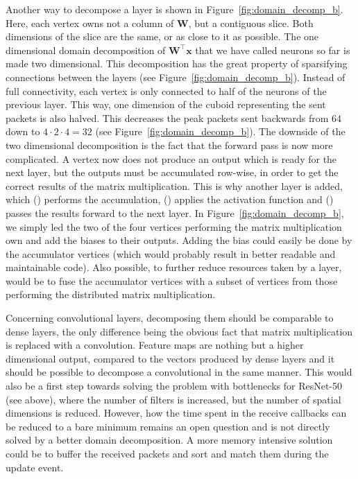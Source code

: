 \documentclass[]{article}
\begin{document}
Another way to decompose a layer is shown in
Figure~\ref{fig:domain_decomp_b}.
Here, each vertex owns not a column of $\mathbf{W}$, but a contiguous
slice.
Both dimensions of the slice are the same, or as close to it as
possible.
The one dimensional domain decomposition of
$\mathbf{W}^\top\mathbf{x}$ that we have called neurons so far is
made two dimensional.
This decomposition has the great property of sparsifying connections
between the layers (see Figure~\ref{fig:domain_decomp_b}).
Instead of full connectivity, each vertex is only connected to half
of the neurons of the previous layer.
This way, one dimension of the cuboid representing the sent packets
is also halved.
This decreases the peak packets sent backwards from $64$ down to
$4 \cdot 2 \cdot 4 = 32$ (see Figure~\ref{fig:domain_decomp_b}).
The downside of the two dimensional decomposition is the fact that
the forward pass is now more complicated.
A vertex now does not produce an output which is ready for the next
layer, but the outputs must be accumulated row-wise, in order to
get the correct results of the matrix multiplication.
This is why another layer is added, which () performs
the accumulation, () applies the activation function
and () passes the results forward to the next layer.
In Figure~\ref{fig:domain_decomp_b}, we simply led the two of the
four vertices performing the matrix multiplication own and add the
biases to their outputs.
Adding the bias could easily be done by the accumulator vertices
(which would probably result in better readable and maintainable
code).
Also possible, to further reduce resources taken by a layer, would be
to fuse the accumulator vertices with a subset of vertices from those
performing the distributed matrix multiplication.

Concerning convolutional layers, decomposing them should be comparable
to dense layers, the only difference being the obvious fact that
matrix multiplication is replaced with a convolution.
Feature maps are nothing but a higher dimensional output, compared
to the vectors produced by dense layers and it should be possible to
decompose a convolutional in the same manner.
This would also be a first step towards solving the problem with
bottlenecks for ResNet-50 (see above), where the number of filters
is increased, but the number of spatial dimensions is reduced.
However, how the time spent in the receive callbacks can be reduced
to a bare minimum remains an open question and is not directly solved
by a better domain decomposition.
A more memory intensive solution could be to buffer the received
packets and sort and match them during the update event.
\end{document}
